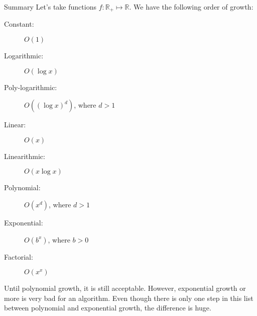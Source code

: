 \documentclass[a4paper]{article}
\begin{document}
\begin{parag}{Summary}
    Let's take functions $f : \mathbb{R}_+ \mapsto \mathbb{R}$. We have the following order of growth:
    \begin{description}
        \item[Constant:] $O(1)$
        \item[Logarithmic:] $O\left(\log x\right)$
        \item[Poly-logarithmic:] $O\left(\left(\log x\right)^{d}\right)$, where $d > 1$
        \item[Linear:] $O\left(x\right)$
        \item[Linearithmic:] $O\left(x\log x\right)$
        \item[Polynomial:] $O\left(x^{d}\right)$, where $d > 1$
        \item[Exponential:] $O\left(b^{x}\right)$, where $b > 0$
        \item[Factorial:] $O\left(x^{x}\right)$
    \end{description}

    Until polynomial growth, it is still acceptable. However, exponential growth or more is very bad for an algorithm. Even though there is only one step in this list between polynomial and exponential growth, the difference is huge.

\end{parag}
\end{document}
